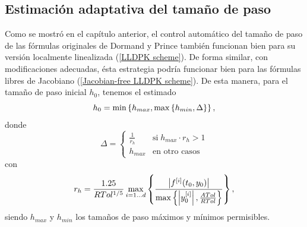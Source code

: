 \subsection{Estimación adaptativa del tamaño de paso}\label{Sec:AdaptiveLLscheme}

Como se mostró en el capítulo anterior, el control automático del tamaño de paso de las fórmulas originales de Dormand y Prince también funcionan bien para su versión localmente linealizada (\ref{LLDPK scheme}). De forma similar, con modificaciones adecuadas, ésta estrategia podría funcionar bien para las fórmulas libres de Jacobiano (\ref{Jacobian-free LLDPK scheme}). De esta manera, para el tamaño de paso inicial $h_0$, tenemos el estimado
\begin{equation}
    h_0 = \min\left\{  h_{max}, \max\left\{  h_{min} ,\Delta \right\}  \right\}, \label{hcero-fj}
\end{equation}
donde
\begin{equation*}
    \Delta = \begin{cases}
        \frac{1}{r_h} & \text{si} \; h_{max}\cdot r_h>1\\
        h_{max} & \text{en otro casos}
        \end{cases}
\end{equation*}
con
\begin{equation*}
     r_h = \frac{1\mathord{.}25}{RTol^{1/5}}\max_{i=1\ldots d}\left\{\frac{ \left\lvert f^{[i]}(t_0,y_0) \right\rvert }
    {\max\left\{ \left\lvert y^{[i]}_0 \right\rvert ,\frac{ATol}{RTol} \right\}}\right\},
\end{equation*}
siendo $h_{max}$ y $h_{min}$ los tamaños de paso máximos y mínimos permisibles.

